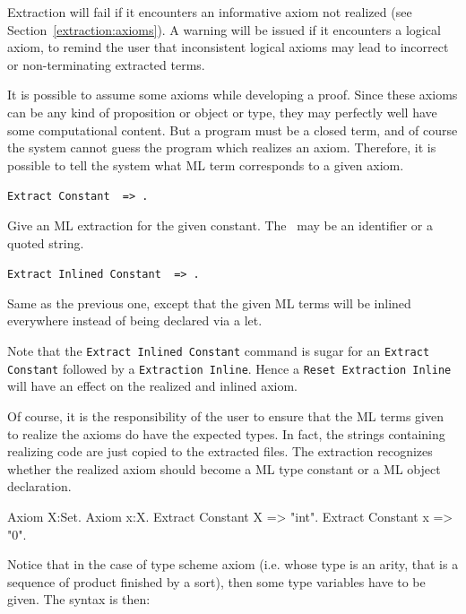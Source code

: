 \label{extraction:axioms}

Extraction will fail if it encounters an informative
axiom not realized (see Section~\ref{extraction:axioms}). 
A warning will be issued if it encounters a logical axiom, to remind the
user that inconsistent logical axioms may lead to incorrect or
non-terminating extracted terms. 

It is possible to assume some axioms while developing a proof. Since
these axioms can be any kind of proposition or object or type, they may
perfectly well have some computational content. But a program must be
a closed term, and of course the system cannot guess the program which
realizes an axiom.  Therefore, it is possible to tell the system
what ML term corresponds to a given axiom. 

\begin{description}
\item{\tt Extract Constant \qualid\ => \str.} ~\par
  Give an ML extraction for the given constant.
  The \str\ may be an identifier or a quoted string.
\item{\tt Extract Inlined Constant \qualid\ => \str.} ~\par
  Same as the previous one, except that the given ML terms will
  be inlined everywhere instead of being declared via a let.
\end{description}

Note that the {\tt Extract Inlined Constant} command is sugar
for an {\tt Extract Constant} followed by a {\tt Extraction Inline}. 
Hence a {\tt Reset Extraction Inline} will have an effect on the
realized and inlined axiom.

Of course, it is the responsibility of the user to ensure that the ML
terms given to realize the axioms do have the expected types.  In
fact, the strings containing realizing code are just copied to the
extracted files. The extraction recognizes whether the realized axiom
should become a ML type constant or a ML object declaration.

\Example
\begin{coq_example*}
Axiom X:Set.
Axiom x:X.
Extract Constant X => "int".
Extract Constant x => "0".
\end{coq_example*}

Notice that in the case of type scheme axiom (i.e. whose type is an
arity, that is a sequence of product finished by a sort), then some type
variables have to be given. The syntax is then:

